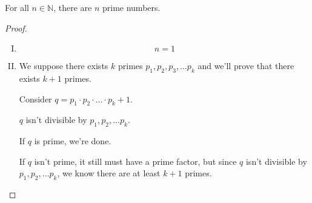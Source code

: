 \documentclass[00_complete]{subfiles}
\begin{document}
\begin{example}
    For all $n \in \mathbb{N}$, there are $n$ prime numbers.
    \begin{proof}
        \begin{enumerate}[I.]
            \item \begin{equation}
                n=1 \tag{\checkmark}
            \end{equation}
            \item We suppose there exists $k$ primes $p_1,p_2,p_3,\dots
                p_k$ and we'll prove that there exists $k+1$ primes.

                Consider $q=p_1\cdot p_2 \cdot \ldots \cdot p_k+1$.

                $q$ isn't divisible by $p_1,p_2,\dots p_k$.

                If $q$ is prime, we're done.

                If $q$ isn't prime, it still must have a prime factor, but
                since $q$ isn't divisible by $p_1,p_2,\dots p_k$, we know there
                are at least $k+1$ primes.
        \end{enumerate}
    \end{proof}
\end{example}
\end{document}
